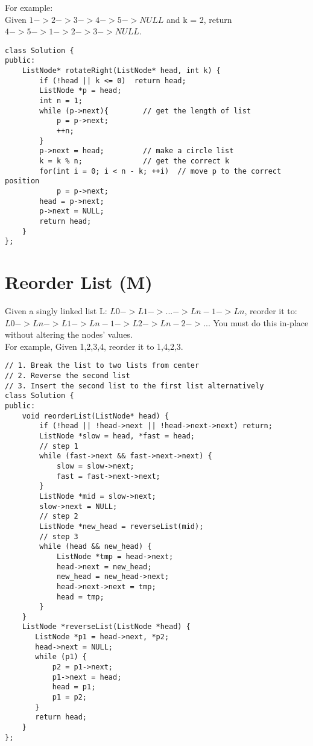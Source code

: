 For example:\\
Given $1->2->3->4->5->NULL$ and k = 2, return $4->5->1->2->3->NULL$.\\

\begin{lstlisting}
class Solution {
public:
    ListNode* rotateRight(ListNode* head, int k) {
        if (!head || k <= 0)  return head;
        ListNode *p = head;
        int n = 1;
        while (p->next){        // get the length of list
            p = p->next;
            ++n;
        }
        p->next = head;         // make a circle list
        k = k % n;              // get the correct k
        for(int i = 0; i < n - k; ++i)  // move p to the correct position
            p = p->next;
        head = p->next;
        p->next = NULL;
        return head;
    }
};
\end{lstlisting}


\section{Reorder List (M)}
Given a singly linked list L: $L0 -> L1 -> ... -> Ln-1 -> Ln$, reorder it to: $L0 -> Ln -> L1 -> Ln-1 -> L2 -> Ln-2 -> ...$ You must do this in-place without altering the nodes' values.\\

For example,
Given {1,2,3,4}, reorder it to {1,4,2,3}. \\

\begin{lstlisting}
// 1. Break the list to two lists from center
// 2. Reverse the second list
// 3. Insert the second list to the first list alternatively
class Solution {
public:
    void reorderList(ListNode* head) {
        if (!head || !head->next || !head->next->next) return;
        ListNode *slow = head, *fast = head;
        // step 1
        while (fast->next && fast->next->next) {
            slow = slow->next;
            fast = fast->next->next;
        }
        ListNode *mid = slow->next;
        slow->next = NULL;
        // step 2
        ListNode *new_head = reverseList(mid);
        // step 3
        while (head && new_head) {
            ListNode *tmp = head->next;
            head->next = new_head;
            new_head = new_head->next;
            head->next->next = tmp;
            head = tmp;
        }
    }
    ListNode *reverseList(ListNode *head) {
       ListNode *p1 = head->next, *p2;
       head->next = NULL;
       while (p1) {
           p2 = p1->next;
           p1->next = head;
           head = p1;
           p1 = p2;
       }
       return head;
    }
};
\end{lstlisting}


